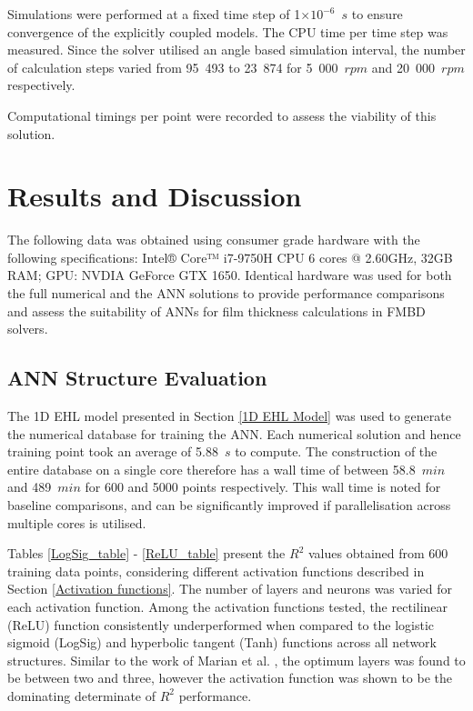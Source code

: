 Simulations were performed at a fixed time step of 1$\times 10^{-6}$~$s$ to ensure convergence of the explicitly coupled models. The CPU time per time step was measured. Since the solver utilised an angle based simulation interval, the number of calculation steps varied from 95~493 to 23~874 for 5~000~$rpm$ and 20~000~$rpm$ respectively.

Computational timings per point were recorded to assess the viability of this solution.


\section{Results and Discussion}

The following data was obtained using consumer grade hardware with the following specifications: 
Intel® Core™ i7-9750H CPU 6 cores @ 2.60GHz, 32GB RAM; GPU: NVDIA GeForce GTX 1650. Identical hardware was used for both the full numerical and the ANN solutions to provide performance comparisons and assess the suitability of ANNs for film thickness calculations in FMBD solvers.

\subsection{ANN Structure Evaluation} \label{ANN Structure Evaluation Results}

The 1D EHL model presented in Section \ref{1D EHL Model} was used to generate the numerical database for training the ANN. Each numerical solution and hence training point took an average of 5.88~$s$ to compute. The construction of the entire database on a single core therefore has a wall time of between 58.8~$min$ and 489~$min$ for 600 and 5000 points respectively. This wall time is noted for baseline comparisons, and can be significantly improved if parallelisation across multiple cores is utilised.

Tables \ref{LogSig_table} - \ref{ReLU_table} present the $R^2$ values obtained from 600 training data points, considering different activation functions described in Section \ref{Activation functions}. The number of layers and neurons was varied for each activation function. Among the activation functions tested, the rectilinear (ReLU) function consistently underperformed when compared to the logistic sigmoid (LogSig) and hyperbolic tangent (Tanh) functions across all network structures.  Similar to the work of Marian et al. \cite{Marian2021}, the optimum layers was found to be between two and three, however the activation function was shown to be the dominating determinate of $R^2$ performance.

